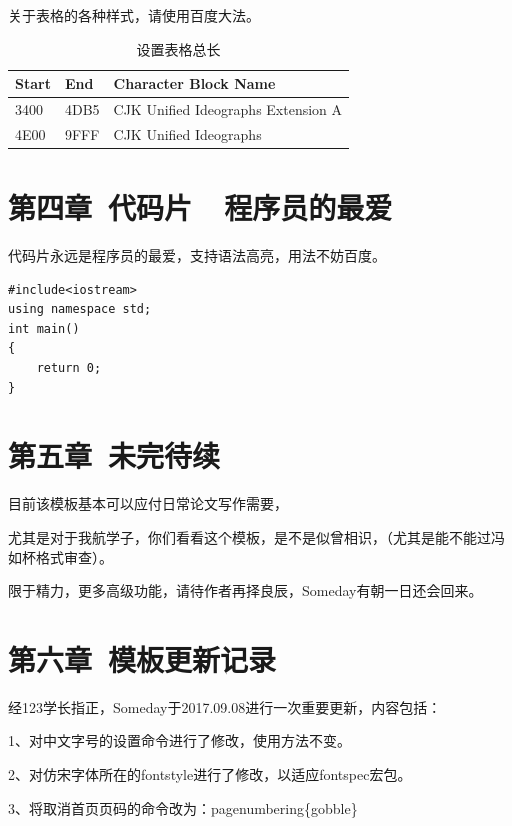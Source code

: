 \documentclass{ctexart}
\begin{document}
关于表格的各种样式，请使用百度大法。\\
\begin{table}[H]
\caption{设置表格总长} 
\begin{tabular*}{12cm}{lll}
\hline  
Start & End  & Character Block Name \\  
\hline  
3400  & 4DB5 & CJK Unified Ideographs Extension A \\  
4E00  & 9FFF & CJK Unified Ideographs \\  
\hline  
\end{tabular*} 
\end{table} 



\section{第四章\ 代码片\ \ 程序员的最爱}
代码片永远是程序员的最爱，支持语法高亮，用法不妨百度。\\
\lstset{language=C}
\begin{lstlisting}
#include<iostream>
using namespace std;
int main()
{
    return 0;
}
\end{lstlisting}


\clearpage

\section{第五章\ 未完待续}

目前该模板基本可以应付日常论文写作需要，\par
尤其是对于我航学子，你们看看这个模板，是不是似曾相识，（尤其是能不能过冯如杯格式审查）。\par
限于精力，更多高级功能，请待作者再择良辰，Someday有朝一日还会回来。

\section{第六章\ 模板更新记录}

经123学长指正，Someday于2017.09.08进行一次重要更新，内容包括：\par
1、对中文字号的设置命令进行了修改，使用方法不变。\par
2、对仿宋字体所在的fontstyle进行了修改，以适应fontspec宏包。\par
3、将取消首页页码的命令改为：pagenumbering\{gobble\} \par
\end{document}
